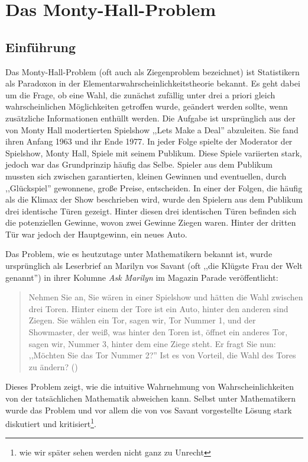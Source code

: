 
\chapter{Das Monty-Hall-Problem}

\section{Einführung}

Das Monty-Hall-Problem (oft auch als Ziegenproblem bezeichnet) ist Statistikern als Paradoxon in der Elementarwahrscheinlichkeitstheorie bekannt. Es geht dabei um die Frage, ob eine Wahl, die zunächst
zufällig unter drei a priori gleich wahrscheinlichen Möglichkeiten getroffen wurde, geändert werden sollte, wenn zusätzliche
Informationen enthüllt werden. Die Aufgabe ist ursprünglich aus der von Monty Hall modertierten Spielshow ,,Lets Make a Deal'' abzuleiten. Sie fand ihren Anfang
1963 und ihr Ende 1977. In jeder Folge spielte der Moderator der Spielshow, Monty Hall, Spiele mit seinem Publikum. Diese Spiele variierten stark, jedoch war das Grundprinzip
häufig das Selbe. Spieler aus dem Publikum mussten sich zwischen garantierten, kleinen Gewinnen und eventuellen, durch ,,Glückspiel'' gewonnene, große Preise, entscheiden.
In einer der Folgen, die häufig als die Klimax der Show beschrieben wird, wurde den Spielern aus dem Publikum drei identische Türen gezeigt. Hinter diesen drei
identischen Türen befinden sich die potenziellen Gewinne, wovon zwei Gewinne Ziegen waren. Hinter der dritten Tür war jedoch der Hauptgewinn, ein neues Auto.

Das Problem, wie es heutzutage unter Mathematikern bekannt ist, wurde ursprünglich als Leserbrief an Marilyn vos Savant (oft ,,die Klügste Frau der Welt genannt'') in ihrer Kolumne \textit{Ask Marilyn} im Magazin Parade veröffentlicht:

\begin{quote}
    Nehmen Sie an, Sie wären in einer Spielshow und hätten die Wahl zwischen drei Toren. Hinter einem der Tore ist ein Auto, hinter den anderen sind Ziegen. Sie wählen ein Tor, sagen wir, Tor Nummer 1, und der Showmaster, der weiß, was hinter den Toren ist, öffnet ein anderes Tor, sagen wir, Nummer 3, hinter dem eine Ziege steht. Er fragt Sie nun: ,,Möchten Sie das Tor Nummer 2?'' Ist es von Vorteil, die Wahl des Tores zu ändern? (\cite{Savant:1990})
\end{quote}

Dieses Problem zeigt, wie die intuitive Wahrnehmung von Wahrscheinlichkeiten von der tatsächlichen Mathematik abweichen kann. Selbst unter Mathematikern wurde das Problem und vor allem die von vos Savant vorgestellte Lösung stark diskutiert und kritisiert\footnote{wie wir später sehen werden nicht ganz zu Unrecht}.

